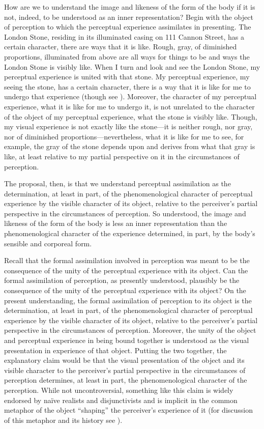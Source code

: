 \documentclass[12pt]{article}
\begin{document}
How are we to understand the image and likeness of the form of the body if it is not, indeed, to be understood as an inner representation? Begin with the object of perception to which the perceptual experience assimilates in presenting. The London Stone, residing in its illuminated casing on 111 Cannon Street, has a certain character, there are ways that it is like. Rough, gray, of diminished proportions, illuminated from above are all ways for things to be and ways the London Stone is visibly like. When I turn and look and see the London Stone, my perceptual experience is united with that stone. My perceptual experience, my seeing the stone, has a certain character, there is a way that it is like for me to undergo that experience (though see \citealt{Snowdon:2010ap}). Moreover, the character of my perceptual experience, what it is like for me to undergo it, is not unrelated to the character of the object of my perceptual experience, what the stone is visibly like. Though, my visual experience is not exactly like the stone---it is neither rough, nor gray, nor of diminished proportions---nevertheless, what it is like for me to see, for example, the gray of the stone depends upon and derives from what that gray is like, at least relative to my partial perspective on it in the circumstances of perception. 

The proposal, then, is that we understand perceptual assimilation as the determination, at least in part, of the phenomenological character of perceptual experience by the visible character of its object, relative to the perceiver's partial perspective in the circumstances of perception. So understood, the image and likeness of the form of the body is less an inner representation than the phenomenological character of the experience determined, in part, by the body's sensible and corporeal form.

Recall that the formal assimilation involved in perception was meant to be the consequence of the unity of the perceptual experience with its object. Can the formal assimilation of perception, as presently understood, plausibly be the consequence of the unity of the perceptual experience with its object? On the present understanding, the formal assimilation of perception to its object is the determination, at least in part, of the phenomenological character of perceptual experience by the visible character of its object, relative to the perceiver's partial perspective in the circumstances of perception. Moreover, the unity of the object and perceptual experience in being bound together is understood as the visual presentation in experience of that object. Putting the two together, the explanatory claim would be that the visual presentation of the object and its visible character to the perceiver's partial perspective in the circumstances of perception determines, at least in part, the phenomenological character of the perception. While not uncontroversial, something like this claim is widely endorsed by na\"{i}ve realists and disjunctivists and is implicit in the common metaphor of the object ``shaping'' the perceiver's experience of it (for discussion of this metaphor and its history see \citealt[chapter 9]{Kalderon:2015fr}).
\end{document}
